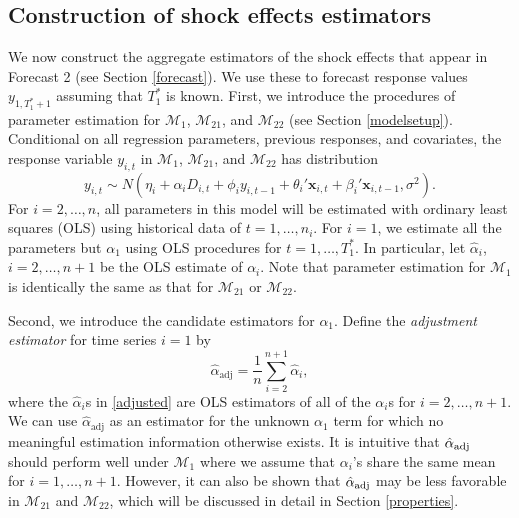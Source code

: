 \documentclass[11pt]{article}
\newcommand{\x}{\textbf{x}}
\def\mc#1{\mathcal{#1}} %
\def\E#1{\mathrm{E}(#1)} %
\theoremstyle{definition}
\begin{document}
\subsection{Construction of shock effects estimators}
\label{constructionofestimators}

We now construct the aggregate estimators of the shock effects that appear in 
Forecast 2 (see Section \ref{forecast}). We use these to forecast response values $y_{1, T_1^*+1}$ assuming that $T_1^*$ is known.  %
First, we introduce the procedures of parameter estimation for 
$\mc{M}_1$, $\mc{M}_{21}$, and $\mc{M}_{22}$ (see Section \ref{modelsetup}). 
Conditional on all regression parameters, previous responses, and covariates, 
the response variable $y_{i,t}$ in $\mc{M}_1$, $\mc{M}_{21}$, and $\mc{M}_{22}$ 
has distribution 
$$
  y_{i,t} 
    \sim N(\eta_i + \alpha_iD_{i,t} + \phi_i y_{i,t-1} + \theta_i'\x_{i,t} 
      + \beta_i'\x_{i,t-1}, \sigma^2).
$$
For $i = 2, \ldots, n$, all parameters in this model will be estimated with ordinary least squares 
(OLS) using historical data of $t = 1, \ldots, n_i$. For $i = 1$, we estimate all the parameters but $\alpha_1$ using OLS procedures for $t=1, \ldots, T_1^*$. In particular, let $\hat{\alpha}_i$, $i = 2, \ldots, n+1$ be the OLS estimate 
of $\alpha_i$.  Note that parameter estimation 
for $\mc{M}_1$ is identically the same as that for $\mc{M}_{21}$ or $\mc{M}_{22}$.  


Second, we introduce the candidate estimators for $\alpha_1$. Define the 
\emph{adjustment estimator} for time series $i=1$ by
\begin{equation} \label{adjusted}
  \hat{\alpha}_{\text{adj}} = \frac{1}{n}\sum_{i=2}^{n+1}\hat{\alpha}_i,
\end{equation}
where the $\hat{\alpha}_i$s in \eqref{adjusted} are OLS estimators of all of 
the $\alpha_i$s for $i = 2, \ldots, n+1$.  We can use $\hat{\alpha}_{\text{adj}}$ as an estimator for 
the unknown $\alpha_1$ term for which no meaningful estimation information 
otherwise exists. It is intuitive that $\hat{\alpha}_{\rm adj}$ should perform 
well under $\mc{M}_1$ where we assume that $\alpha_i$'s share the same mean 
for $i= 1, \ldots, n+1$. However, it can also be shown that 
$\hat{\alpha}_{\rm adj}$ may be less favorable in $\mc{M}_{21}$ 
and $\mc{M}_{22}$, which will be discussed in detail in Section \ref{properties}. 
\end{document}
